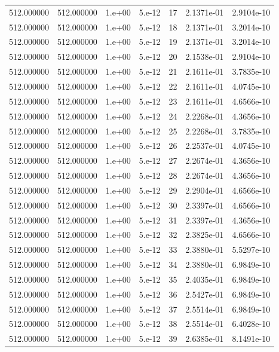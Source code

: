 \begin{table}[htbp]
\begin{tabular}{rrrrrrr}
512.000000 & 512.000000 & 1.e+00 & 5.e-12 & 17 & 2.1371e-01 & 2.9104e-10 \\
512.000000 & 512.000000 & 1.e+00 & 5.e-12 & 18 & 2.1371e-01 & 3.2014e-10 \\
512.000000 & 512.000000 & 1.e+00 & 5.e-12 & 19 & 2.1371e-01 & 3.2014e-10 \\
512.000000 & 512.000000 & 1.e+00 & 5.e-12 & 20 & 2.1538e-01 & 2.9104e-10 \\
512.000000 & 512.000000 & 1.e+00 & 5.e-12 & 21 & 2.1611e-01 & 3.7835e-10 \\
512.000000 & 512.000000 & 1.e+00 & 5.e-12 & 22 & 2.1611e-01 & 4.0745e-10 \\
512.000000 & 512.000000 & 1.e+00 & 5.e-12 & 23 & 2.1611e-01 & 4.6566e-10 \\
512.000000 & 512.000000 & 1.e+00 & 5.e-12 & 24 & 2.2268e-01 & 4.3656e-10 \\
512.000000 & 512.000000 & 1.e+00 & 5.e-12 & 25 & 2.2268e-01 & 3.7835e-10 \\
512.000000 & 512.000000 & 1.e+00 & 5.e-12 & 26 & 2.2537e-01 & 4.0745e-10 \\
512.000000 & 512.000000 & 1.e+00 & 5.e-12 & 27 & 2.2674e-01 & 4.3656e-10 \\
512.000000 & 512.000000 & 1.e+00 & 5.e-12 & 28 & 2.2674e-01 & 4.3656e-10 \\
512.000000 & 512.000000 & 1.e+00 & 5.e-12 & 29 & 2.2904e-01 & 4.6566e-10 \\
512.000000 & 512.000000 & 1.e+00 & 5.e-12 & 30 & 2.3397e-01 & 4.6566e-10 \\
512.000000 & 512.000000 & 1.e+00 & 5.e-12 & 31 & 2.3397e-01 & 4.3656e-10 \\
512.000000 & 512.000000 & 1.e+00 & 5.e-12 & 32 & 2.3825e-01 & 4.6566e-10 \\
512.000000 & 512.000000 & 1.e+00 & 5.e-12 & 33 & 2.3880e-01 & 5.5297e-10 \\
512.000000 & 512.000000 & 1.e+00 & 5.e-12 & 34 & 2.3880e-01 & 6.9849e-10 \\
512.000000 & 512.000000 & 1.e+00 & 5.e-12 & 35 & 2.4035e-01 & 6.9849e-10 \\
512.000000 & 512.000000 & 1.e+00 & 5.e-12 & 36 & 2.5427e-01 & 6.9849e-10 \\
512.000000 & 512.000000 & 1.e+00 & 5.e-12 & 37 & 2.5514e-01 & 6.9849e-10 \\
512.000000 & 512.000000 & 1.e+00 & 5.e-12 & 38 & 2.5514e-01 & 6.4028e-10 \\
512.000000 & 512.000000 & 1.e+00 & 5.e-12 & 39 & 2.6385e-01 & 8.1491e-10 \\

\end{tabular}
\end{table}
